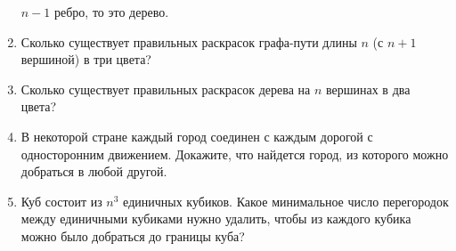\begin{enumerate}
        $n-1$ ребро, то это дерево.
    \item Сколько существует правильных раскрасок графа-пути длины
        $n$ (с $n+1$ вершиной) в три цвета?
    \item Сколько существует правильных раскрасок дерева на $n$
        вершинах в два цвета?
    \item В некоторой стране каждый город соединен с каждым дорогой
        с односторонним движением. Докажите, что найдется город, из
        которого можно добраться в любой другой.
    \item Куб состоит из $n^3$ единичных кубиков. Какое минимальное
        число перегородок между единичными кубиками нужно удалить,
        чтобы из каждого кубика можно было добраться до границы куба?
\end{enumerate}

